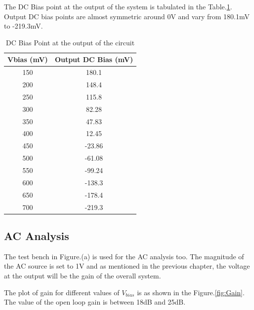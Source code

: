 The DC Bias point at the output of the system is tabulated in the Table.\ref{tab:DC}. Output DC bias points are almost symmetric around 0V and vary from 180.1mV to -219.3mV.
\begin{table} [H]
\centering
\begin{tabular}{@{}cc@{}}
\toprule
Vbias (mV)			& Output DC Bias (mV)	\\ \midrule
150					& 180.1  \\
200					& 148.4  \\
250					& 115.8  \\
300					& 82.28	 \\
350					& 47.83	 \\
400					& 12.45	 \\
450					& -23.86 \\
500					& -61.08 \\
550					& -99.24 \\
600					& -138.3 \\
650					& -178.4 \\
700 				& -219.3 \\
\bottomrule
\end{tabular}
\caption{DC Bias Point at the output of the circuit}
\label{tab:DC}
\end{table}

\subsection{AC Analysis}

The test bench in Figure.(a) is used for the AC analysis too. The magnitude of the AC source is set to 1V and as mentioned in the previous chapter, the voltage at the output will be the gain of the overall system.

The plot of gain for different values of $V_{bias}$ is as shown in the Figure.\ref{fig:Gain}. The value of the open loop gain is between 18dB and 25dB.

